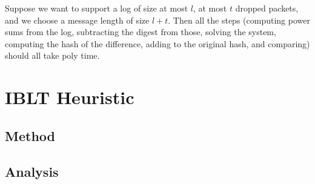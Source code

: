 \documentclass{article}
\begin{document}
Suppose we want to support a log of size at most $l$, at most $t$ dropped
packets, and we choose a message length of size $l + t$. Then all the steps
(computing power sums from the log, subtracting the digest from those, solving
the system, computing the hash of the difference, adding to the original hash,
and comparing) should all take poly time.

\section{IBLT Heuristic}
\subsection{Method}

\subsection{Analysis}

\printbibliography
\end{document}
